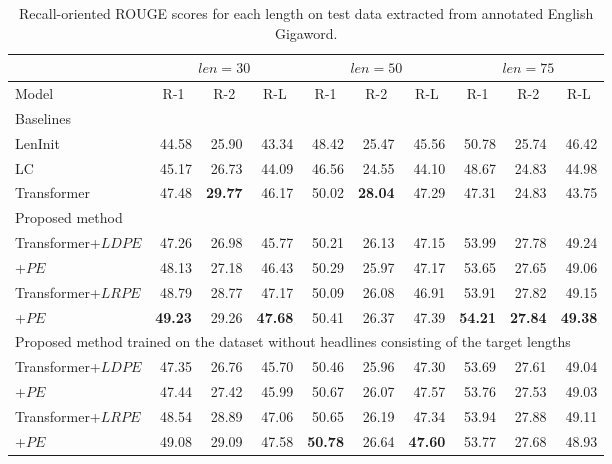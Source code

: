\documentclass[11pt,a4paper]{article}
\begin{document}
\begin{table}[!t]
  \centering
  \footnotesize
  \begin{tabular}{| l | r r r | r r r | r r r |} \hline
  & \multicolumn{3}{|c|}{$len = 30$} & \multicolumn{3}{c|}{$len = 50$} & \multicolumn{3}{c|}{$len = 75$} \\ \hline
  Model & \multicolumn{1}{c}{R-1} & \multicolumn{1}{c}{R-2} & \multicolumn{1}{c|}{R-L} & \multicolumn{1}{c}{R-1} & \multicolumn{1}{c}{R-2} & \multicolumn{1}{c|}{R-L} & \multicolumn{1}{c}{R-1} & \multicolumn{1}{c}{R-2} & \multicolumn{1}{c|}{R-L} \\ \hline
  \multicolumn{10}{|l|}{Baselines} \\ \hline
  LenInit& 44.58 & 25.90 & 43.34 & 48.42 & 25.47 & 45.56 & 50.78 & 25.74 & 46.42 \\
  LC & 45.17 & 26.73 & 44.09 & 46.56 & 24.55 & 44.10 & 48.67 & 24.83 & 44.98 \\
  Transformer & 47.48 & {\bf 29.77} & 46.17 & 50.02 & {\bf 28.04} & 47.29 & 47.31 & 24.83 & 43.75 \\ \hline
  \multicolumn{10}{|l|}{Proposed method} \\ \hline
  Transformer+$LDPE$ & 47.26 & 26.98 & 45.77 & 50.21 & 26.13 & 47.15 & 53.99 & 27.78 & 49.24 \\
  +$PE$ & 48.13 & 27.18 & 46.43 & 50.29 & 25.97 & 47.17 & 53.65 & 27.65 & 49.06 \\
  Transformer+$LRPE$ & 48.79 & 28.77 & 47.17 & 50.09 & 26.08 & 46.91 & 53.91 & 27.82 & 49.15 \\
  +$PE$ & {\bf 49.23} & 29.26 & {\bf 47.68} & 50.41 & 26.37 & 47.39 & {\bf 54.21} & {\bf 27.84} & {\bf 49.38} \\ \hline
  \multicolumn{10}{|l|}{Proposed method trained on the dataset without headlines consisting of the target lengths} \\ \hline
  Transformer+$LDPE$ & 47.35 & 26.76 & 45.70 & 50.46 & 25.96 & 47.30 & 53.69 & 27.61 & 49.04 \\
  +$PE$ & 47.44 & 27.42 & 45.99 & 50.67 & 26.07 & 47.57 & 53.76 & 27.53 & 49.03 \\
  Transformer+$LRPE$ & 48.54 & 28.89 & 47.06 & 50.65 & 26.19 & 47.34 & 53.94 & 27.88 & 49.11 \\
  +$PE$ & 49.08 & 29.09 & 47.58 & {\bf 50.78} & 26.64 & {\bf 47.60} & 53.77 & 27.68 & 48.93 \\ \hline
  \end{tabular}
  \caption{Recall-oriented ROUGE scores for each length on test data extracted from annotated English Gigaword.\label{tab:engiga_result}}
\end{table}
\end{document}

